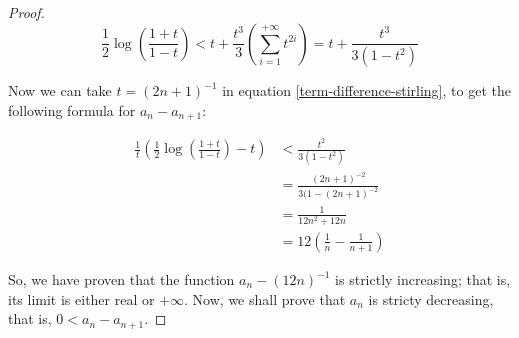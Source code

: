 \documentclass[12pt,a4paper]{report}
\numberwithin{equation}{section}
\theoremstyle{definition}
\theoremstyle{remark}
\begin{document}
\begin{proof}
\begin{equation}
\frac 12 \log \left( \frac{1+t}{1-t} \right) <
t + \frac{t^3}{3} \left(
\sum_{i=1}^{+\infty} t^{2i}
\right) = t + \frac{t^3}{3 (1-t^2)}
\end{equation}

Now we can take $t = (2n+1)^{-1}$ in equation \eqref{term-difference-stirling}, to get the following formula for $a_n - a_{n+1}$:

\begin{align}
\frac 1t \left(
\frac 12 \log \left(\frac{1+t}{1-t}\right) -t
\right) &<
\frac{t^2}{3(1-t^2)} \\
&=
\frac{(2n+1)^{-2}}{3(1-(2n+1)^{-2}} \\ 
&= \frac 1{12n^2 + 12n} \\ 
&= 12 \left(\frac 1n - \frac{1}{n+1}\right)
\end{align}

So, we have proven that the function $a_n - (12 n) ^{-1}$ is strictly increasing; that is, its limit is either real or $+\infty$. Now, we shall prove that $a_n$ is stricty decreasing, that is, $0<a_n - a_{n+1}$.

\end{proof}

\tableofcontents
\end{document}
